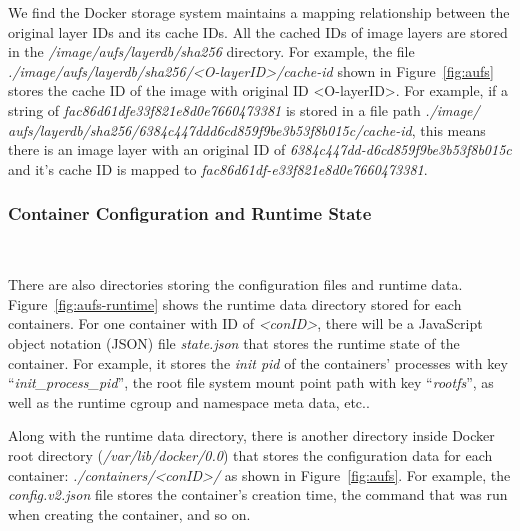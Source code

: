 We find the Docker storage system maintains a mapping relationship between the original layer IDs and its cache IDs. All the cached IDs of image layers are stored in the \textit{/image/aufs/layerdb/sha256} directory.
For example, the file \textit{./image/aufs/layerdb/sha256/<O-layerID>/cache-id} shown in Figure~\ref{fig:aufs} stores the cache ID of the image with original ID <O-layerID>. For example, if a string of \textit{
fac86d61dfe33f821e8d0e7660473381} is stored in a file path \textit{./image/ aufs/layerdb/sha256/6384c447ddd6cd859f9be3b53f8b015c/cache-id}, this means there is an image layer with an original ID of \textit{
6384c447dd-d6cd859f9be3b53f8b015c} and it's cache ID is mapped to \textit{
fac86d61df-e33f821e8d0e7660473381}.



\smallbreak  
\subsubsection{Container Configuration and Runtime State}
~\smallbreak

There are also directories storing the configuration files and runtime data. Figure~\ref{fig:aufs-runtime} shows the runtime data directory stored for each containers. For one container with ID of \textit{<conID>}, there will be a JavaScript object notation (JSON)  file \textit{state.json} that stores the runtime state of the container. For example, it stores the \textit{init pid} of the containers' processes with key ``\textit{init\_process\_pid}'', the root file system mount point path with key ``\textit{rootfs}'', as well as the runtime cgroup and namespace meta data, etc.. 

Along with the runtime data directory, there is another directory inside Docker root directory (\textit{/var/lib/docker/0.0}) that stores the configuration data for each container: \textit{./containers/<conID>/} as shown in Figure~\ref{fig:aufs}. For example, the \textit{ config.v2.json} file stores the container's creation time, the command that was run when creating the container, and so on.



